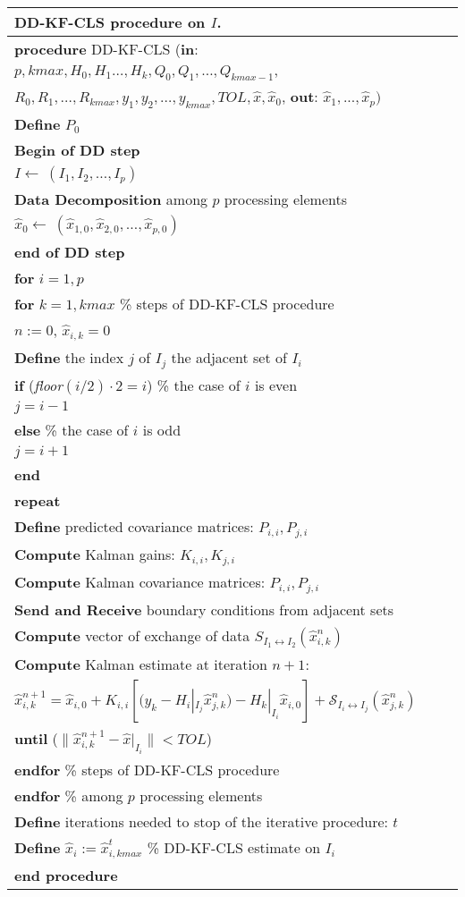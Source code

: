 \documentclass{report}
\begin{document}
\begin{tabular}{l}
\hline

DD-KF-CLS procedure on $I$.\\
\hline
\textbf{procedure}  DD-KF-CLS (\textbf{in}: $p,kmax,H_{0},H_1\ldots,H_k,Q_0,Q_1,\ldots,Q_{kmax-1}$,\\$R_0,R_1,\ldots,R_{kmax},y_1,y_2,\ldots,y_{kmax},TOL,\widehat{x},\widehat{x}_0$, \textbf{out}: $\widehat{x}_{1},...,\widehat{x}_{p})$\\

\textbf{Define} $P_{0}$\\
\textbf{Begin of DD step}\\
$I\longleftarrow \ (I_1,I_2,\ldots,I_p)$\\
\textbf{Data Decomposition} among $p$ processing elements\\
$\widehat{x}_0\longleftarrow \ (\widehat{x}_{1,0},\widehat{x}_{2,0},\ldots,\widehat{x}_{p,0})$\\
\textbf{end of DD step}\\
\textbf{for} $i=1,p$\\
\textbf{for} $k=1,kmax$ \% steps of DD-KF-CLS procedure\\
$n:=0$, $\widehat{x}_{i,k}=0$\\
\textbf{Define} the index $j$ of $I_{j}$ the adjacent set of $I_i$ \\
\textbf{if} (\textit{floor}$(i/2)\cdot 2=i$)  \% the case of $i$ is even\\
$j=i-1$  \\
\textbf{else} \% the case of $i$ is odd\\
$j=i+1$ \\
\textbf{end} \\
\textbf{repeat}\\
\textbf{Define}  predicted covariance matrices: $P_{i,i},P_{j,i}$\\
\textbf{Compute} Kalman gains: $K_{i,i},K_{j,i}$\\
\textbf{Compute} Kalman covariance matrices: $P_{i,i},P_{j,i}$\\
\textbf{Send and Receive} boundary conditions from adjacent sets\\
\textbf{Compute} vector of exchange of data $S_{I_{1}\leftrightarrow I_2}(\widehat{x}_{i,k}^{n})$\\
\textbf{Compute} Kalman estimate at iteration $n+1$:\\ $\widehat{x}_{i,k}^{n+1}=\widehat{x}_{i,0}+K_{i,i}\left[({y}_{k}-{H}_{i}|_{I_{j}}\widehat{x}_{j,k}^{n})-H_{k}|_{I_{i}}\widehat{x}_{i,0}\right]+\mathcal{S}_{I_{i}\leftrightarrow I_{j}}(\widehat{x}_{j,k}^{n})$\\
\textbf{until} ($\| \widehat{x}_{i,k}^{n+1}-\widehat{x}|_{I_{i}} \| <TOL$)\\
\textbf{endfor} \% steps of DD-KF-CLS procedure\\
\textbf{endfor} \% among $p$ processing elements \\
\textbf{Define} iterations needed to stop of the iterative
procedure: $t$\\
\textbf{Define} $\widehat{x}_{i}:=\widehat{x}_{i,kmax}^{t}$ \% DD-KF-CLS estimate on $I_i$\\
\textbf{end procedure}\\
\hline
\end{tabular}
\end{document}
